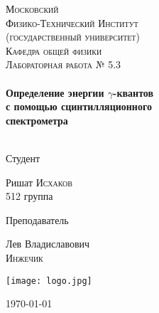 \begin{titlepage}
\center %
 

\textsc{\LARGE Московский\\[-0.2cm]Физико-Технический Институт\\[0.1cm]\large (государственный университет)}\\[1.5cm] %
\textsc{\Large Кафедра общей физики}\\[0.1cm] %
\textsc{\large Лабораторная работа № 5.3}\\[0.5cm] %


\HRule
\\
{\huge \bfseries Определение энергии $\gamma$-квантов \\[-0.3cm] с помощью сцинтилляционного \\[0.3cm] спектрометра}
\\[0.3cm] %
\HRule
\\[1.5cm]


 

\begin{minipage}[t]{0.48\textwidth}
	\begin{flushleft} \large
		\textsf{Студент}
		
		Ришат \textsc{Исхаков} \\[-0.15cm]
		512 группа

	\end{flushleft}
\end{minipage}
\hfill
\begin{minipage}[t]{0.48\textwidth}
	\begin{flushright} \large
		\textsf{Преподаватель}		
		
		Лев Владиславович \\[-0.15cm]
		\textsc{Инжечик} 

	\end{flushright}
\end{minipage}

\begin{bottompar}
	\begin{center}
		\texttt{[image: logo.jpg]}
	\end{center}
	\today

\end{bottompar}
\vfill %

\end{titlepage}